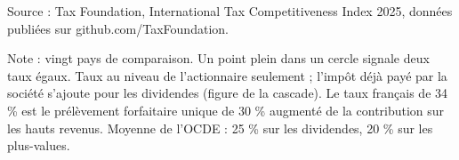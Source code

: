 Source : Tax Foundation, International Tax Competitiveness Index 2025, données publiées sur github.com/TaxFoundation.\par Note : vingt pays de comparaison. Un point plein dans un cercle signale deux taux égaux. Taux au niveau de l'actionnaire seulement ; l'impôt déjà payé par la société s'ajoute pour les dividendes (figure de la cascade). Le taux français de 34 \% est le prélèvement forfaitaire unique de 30 \% augmenté de la contribution sur les hauts revenus. Moyenne de l'OCDE : 25 \% sur les dividendes, 20 \% sur les plus-values.
